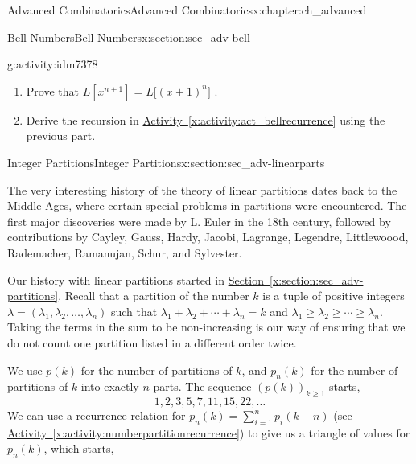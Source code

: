 \documentclass[oneside,10pt,]{book}
\numberwithin{equation}{chapter}
\begin{document}
\begin{chapterptx}{Advanced Combinatorics}{}{Advanced Combinatorics}{}{}{x:chapter:ch_advanced}
\begin{sectionptx}{Bell Numbers}{}{Bell Numbers}{}{}{x:section:sec_adv-bell}
\begin{activity}{}{g:activity:idm7378}
\begin{enumerate}
\item{}Prove that \(L\left\lbrack x^{n + 1} \right\rbrack = L\lbrack\left( x + 1 \right)^{n}\rbrack\) .%
\item{}Derive the recursion in \hyperref[x:activity:act_bellrecurrence]{Activity~\ref{x:activity:act_bellrecurrence}} using the previous part.%
\end{enumerate}
%
\end{activity}
\end{sectionptx}
%
%
\typeout{************************************************}
\typeout{************************************************}
%
\begin{sectionptx}{Integer Partitions}{}{Integer Partitions}{}{}{x:section:sec_adv-linearparts}
\begin{introduction}{}%
The very interesting history of the theory of linear partitions dates back to the Middle Ages, where certain special problems in partitions were encountered.  The first major discoveries were made by L. Euler in the 18th century, followed by contributions by Cayley, Gauss, Hardy, Jacobi, Lagrange, Legendre, Littlewoood, Rademacher, Ramanujan, Schur, and Sylvester.%
\par
Our history with linear partitions started in \hyperref[x:section:sec_adv-partitions]{Section~\ref{x:section:sec_adv-partitions}}.  Recall that a partition of the number \(k\) is a tuple of positive integers \(\lambda = (\lambda_1, \lambda_2, \ldots, \lambda_n)\) such that \(\lambda_1 + \lambda_2 + \cdots + \lambda_n = k\) and \(\lambda_1 \ge \lambda_2 \ge \cdots \ge \lambda_n\).  Taking the terms in the sum to be non-increasing is our way of ensuring that we do not count one partition listed in a different order twice.%
\par
We use \(p(k)\) for the number of partitions of \(k\), and \(p_n(k)\) for the number of partitions of \(k\) into exactly \(n\) parts.  The sequence \((p(k))_{k \ge 1}\) starts,%
\begin{equation*}
1, 2, 3, 5, 7, 11, 15, 22,\ldots
\end{equation*}
We can use a recurrence relation for \(p_n(k) = \sum_{i=1}^n p_i(k-n)\) (see \hyperref[x:activity:numberpartitionrecurrence]{Activity~\ref{x:activity:numberpartitionrecurrence}}) to give us a triangle of values for \(p_n(k)\), which starts,%
\begin{sidebyside}{1}{0}{0}{0}%
\begin{sbspanel}{1}%
{\centering%
\begin{tabular}{llllllll}

\end{tabular}}
\end{sbspanel}
\end{sidebyside}
\end{introduction}
\end{sectionptx}
\end{chapterptx}
\end{document}
